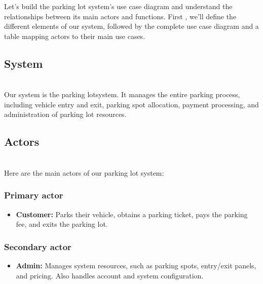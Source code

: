 

Let's build the parking lot system's use case diagram and understand the relationships between its main actors and functions. First , we'll define the different elements of our system, followed by the complete use case diagram and a table mapping actors to their main use cases.

\subsection{System}\label{FAPeK8Qy7AzrvTTFVMrFt}
\\
Our system is the parking lotsystem. It manages the entire parking process, including vehicle entry and exit, parking spot allocation, payment processing, and administration of parking lot resources.

\subsection{Actors}\label{JK_r_vlh9PvNns_Zk06lF}
\\
Here are the main actors of our parking lot system:

\subsubsection{Primary actor}\label{r6d6miuE-BmDR-66nxMsL}

\begin{itemize}
\item
\protect{}\label{ibUgx1iSX-oOFkvnGIFGO}
\textbf{Customer:} Parks their vehicle, obtains a parking ticket, pays the parking fee, and exits the parking lot.
\end{itemize}

\subsubsection{Secondary actor}\label{YTn-ZJRqWz6EWDUSb0Wtp}

\begin{itemize}
\item
\protect{}\label{GNYj_v9q0w4KCWYlL80ke}
\textbf{Admin:} Manages system resources, such as parking spots, entry/exit panels, and pricing. Also handles account and system configuration.
\end{itemize}

